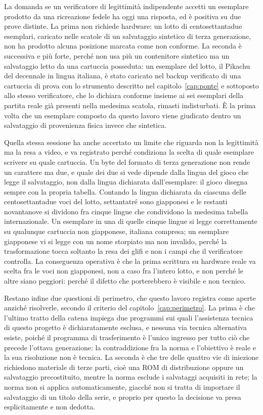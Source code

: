 La domanda se un verificatore di legittimità indipendente accetti un esemplare prodotto da una ricreazione fedele ha oggi una risposta, ed è positiva su due prove distinte. La prima non richiede hardware: un lotto di centosettantadue esemplari, caricato nelle scatole di un salvataggio sintetico di terza generazione, non ha prodotto alcuna posizione marcata come non conforme. La seconda è successiva e più forte, perché non usa più un contenitore sintetico ma un salvataggio letto da una cartuccia posseduta: un esemplare del lotto, il Pikachu del decennale in lingua italiana, è stato caricato nel backup verificato di una cartuccia di prova con lo strumento descritto nel capitolo~\ref{cap:ponte} e sottoposto allo stesso verificatore, che lo dichiara conforme insieme ai sei esemplari della partita reale già presenti nella medesima scatola, rimasti indisturbati. È la prima volta che un esemplare composto da questo lavoro viene giudicato dentro un salvataggio di provenienza fisica invece che sintetica.

Quella stessa sessione ha anche accertato un limite che riguarda non la legittimità ma la resa a video, e va registrato perché condiziona la scelta di quale esemplare scrivere su quale cartuccia. Un byte del formato di terza generazione non rende un carattere ma due, e quale dei due si vede dipende dalla lingua del gioco che legge il salvataggio, non dalla lingua dichiarata dall'esemplare: il gioco disegna sempre con la propria tabella. Contando la lingua dichiarata da ciascuna delle centosettantadue voci del lotto, settantatré sono giapponesi e le restanti novantanove si dividono fra cinque lingue che condividono la medesima tabella internazionale. Un esemplare in una di quelle cinque lingue si legge correttamente su qualunque cartuccia non giapponese, italiana compresa; un esemplare giapponese vi si legge con un nome storpiato ma non invalido, perché la trasformazione tocca soltanto la resa dei glifi e non i campi che il verificatore controlla. La conseguenza operativa è che la prima scrittura su hardware reale va scelta fra le voci non giapponesi, non a caso fra l'intero lotto, e non perché le altre siano peggiori: perché il difetto che porterebbero è visibile e non tecnico.

Restano infine due questioni di perimetro, che questo lavoro registra come aperte anziché risolverle, secondo il criterio del capitolo~\ref{cap:perimetro}. La prima è che l'ultimo tratto della catena impiega due programmi sui quali l'assistenza tecnica di questo progetto è dichiaratamente esclusa, e nessuna via tecnica alternativa esiste, poiché il programma di trasferimento è l'unico ingresso per tutto ciò che precede l'ottava generazione: la contraddizione fra la norma e l'obiettivo è reale e la sua risoluzione non è tecnica. La seconda è che tre delle quattro vie di iniezione richiedono materiale di terze parti, cioè una ROM di distribuzione oppure un salvataggio precostituito, mentre la norma esclude i salvataggi acquisiti in rete; la norma non si applica automaticamente, giacché non si tratta di importare il salvataggio di un titolo della serie, e proprio per questo la decisione va presa esplicitamente e non dedotta.

